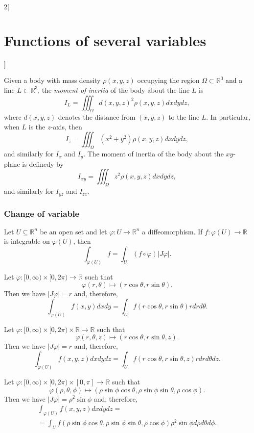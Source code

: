 \documentclass[class=article,10pt,crop=false]{standalone}
\begin{document}
\begin{multicols}{2}[\section{Functions of several variables}]
\begin{definition}
Given a body with mass density $\rho(x,y,z)$ occupying the region $\Omega\subset\mathbb{R}^3$ and a line $L\subset\mathbb{R}^3$, the \textit{moment of inertia} of the body about the line $L$ is $$I_L=\iiint_\Omega d(x,y,z)^2\rho(x,y,z)dxdydz,$$ where $d(x,y,z)$ denotes the distance from $(x,y,z)$ to the line $L$. In particular, when $L$ is the $z$-axis, then $$I_z=\iiint_\Omega (x^2+y^2)\rho(x,y,z)dxdydz,$$ and similarly for $I_x$ and $I_y$. The moment of inertia of the body about the $xy$-plane is definedy by $$I_{xy}=\iiint_\Omega z^2\rho(x,y,z)dxdydz,$$ and similarly for $I_{yz}$ and $I_{zx}.$
\end{definition}
\subsubsection{Change of variable}
\begin{theorem}
Let $U\subseteq\mathbb{R}^n$ be an open set and let $\varphi:U\rightarrow\mathbb{R}^n$ a diffeomorphism. If $f:\varphi(U)\rightarrow\mathbb{R}$ is integrable on $\varphi(U)$, then $$\int_{\varphi(U)} f=\int_U(f\circ\varphi)|J\varphi|.$$
\end{theorem}
\begin{corollary}
Let $\varphi:[0,\infty)\times[0,2\pi)\rightarrow\mathbb{R}$ such that
$$\varphi(r,\theta)\mapsto(r\cos\theta,r\sin\theta).$$
Then we have $|J\varphi|=r$ and, therefore, $$\int_{\varphi(U)}f(x,y)dxdy=\int_Uf(r\cos\theta,r\sin\theta)rdrd\theta.$$
\end{corollary}
\begin{corollary}
Let $\varphi:[0,\infty)\times[0,2\pi)\times\mathbb{R}\rightarrow\mathbb{R}$ such that $$\varphi(r,\theta,z)\mapsto(r\cos\theta,r\sin\theta,z).$$
Then we have $|J\varphi|=r$ and, therefore, $$\int_{\varphi(U)}f(x,y,z)dxdydz=\int_Uf(r\cos\theta,r\sin\theta,z)rdrd\theta dz.$$
\end{corollary}
\begin{corollary}
Let $\varphi:[0,\infty)\times[0,2\pi)\times[0,\pi]\rightarrow\mathbb{R}$ such that $$\varphi(\rho,\theta,\phi)\mapsto(\rho\sin\phi\cos\theta,\rho\sin\phi\sin\theta,\rho\cos\phi).$$
Then we have $|J\varphi|=\rho^2\sin\phi$ and, therefore, 
\begin{multline*}
    \int_{\varphi(U)}f(x,y,z)dxdydz=\\=\int_Uf(\rho\sin\phi\cos\theta,\rho\sin\phi\sin\theta,\rho\cos\phi)\rho^2\sin\phi d\rho d\theta d\phi.
\end{multline*}
\end{corollary}

\end{multicols}
\end{document}
